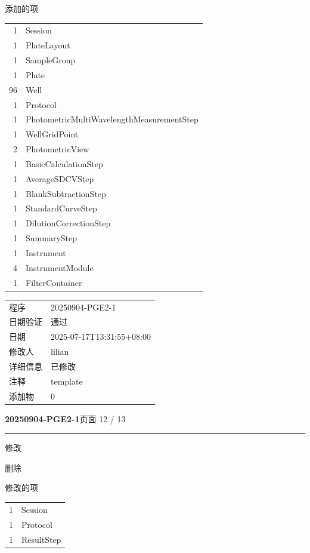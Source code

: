 \documentclass[UTF8,10pt,a4paper,fontset=fandol]{ctexart}
\begin{document}
\noindent 添加的项

\begin{tabular}{@{}rl@{}}
1 & Session\\
1 & PlateLayout\\
1 & SampleGroup\\
1 & Plate\\
96 & Well\\
1 & Protocol\\
1 & PhotometricMultiWavelengthMeasurementStep\\
1 & WellGridPoint\\
2 & PhotometricView\\
1 & BasicCalculationStep\\
1 & AverageSDCVStep\\
1 & BlankSubtractionStep\\
1 & StandardCurveStep\\
1 & DilutionCorrectionStep\\
1 & SummaryStep\\
1 & Instrument\\
4 & InstrumentModule\\
1 & FilterContainer
\end{tabular}

\medskip

\begin{tabular}{@{}p{3.2cm}l@{}}
程序 & 20250904-PGE2-1\\
日期验证 & 通过\\
日期 & 2025-07-17T13:31:55+08:00\\
修改人 & lilian\\
详细信息 & 已修改\\
注释 & template\\[0.5em]
添加物 & 0
\end{tabular}

\newpage

\noindent\textbf{20250904-PGE2-1}\hfill 页面 12 / 13

\hrule

\smallskip

\noindent
修改

\noindent
删除

\noindent
修改的项

\begin{tabular}{@{}r l@{}}
1 & Session\\
1 & Protocol\\
1 & ResultStep
\end{tabular}
\end{document}
